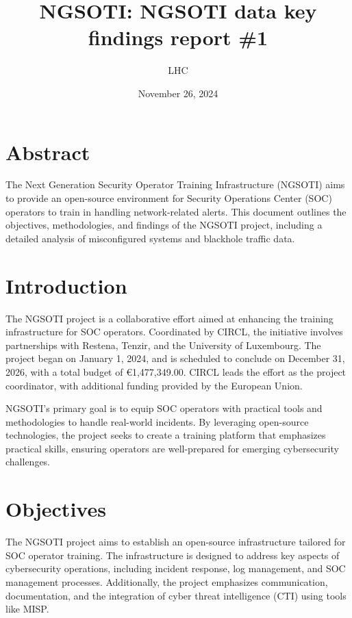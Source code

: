 \documentclass[10pt,a4paper]{report}
\title{NGSOTI: NGSOTI data key findings report \#1}
\author{LHC}
\date{November 26, 2024}
\begin{document}
\maketitle

\chapter*{Abstract}
The Next Generation Security Operator Training Infrastructure (NGSOTI) aims to provide an open-source environment for Security Operations Center (SOC) operators to train in handling network-related alerts. This document outlines the objectives, methodologies, and findings of the NGSOTI project, including a detailed analysis of misconfigured systems and blackhole traffic data.

\tableofcontents

\chapter{Introduction}
The NGSOTI project is a collaborative effort aimed at enhancing the training infrastructure for SOC operators. Coordinated by CIRCL, the initiative involves partnerships with Restena, Tenzir, and the University of Luxembourg. The project began on January 1, 2024, and is scheduled to conclude on December 31, 2026, with a total budget of €1,477,349.00. CIRCL leads the effort as the project coordinator, with additional funding provided by the European Union. 

NGSOTI's primary goal is to equip SOC operators with practical tools and methodologies to handle real-world incidents. By leveraging open-source technologies, the project seeks to create a training platform that emphasizes practical skills, ensuring operators are well-prepared for emerging cybersecurity challenges.

\chapter{Objectives}
The NGSOTI project aims to establish an open-source infrastructure tailored for SOC operator training. The infrastructure is designed to address key aspects of cybersecurity operations, including incident response, log management, and SOC management processes. Additionally, the project emphasizes communication, documentation, and the integration of cyber threat intelligence (CTI) using tools like MISP.
\end{document}
